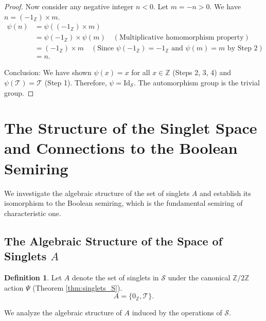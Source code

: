 \documentclass[11pt, a4paper]{article}
\theoremstyle{plain}
\theoremstyle{definition}
\newtheorem{definition}[theorem]{Definition}
\numberwithin{equation}{section}
\newcommand{\Z}{\mathbb{Z}}
\newcommand{\Tobj}{\mathcal{T}} %
\newcommand{\SemiringS}{\mathcal{S}}
\newcommand{\Ztwo}{\mathbb{Z}/2\mathbb{Z}}
\newcommand{\Id}{\mathrm{Id}}
\begin{document}
\begin{proof}
Now consider any negative integer $n<0$. Let $m=-n>0$. We have $n = (-1_{\Z})\times m$.
\begin{align*}
    \psi(n) &= \psi((-1_{\Z})\times m) \\
    &= \psi(-1_{\Z})\times\psi(m) \quad (\text{Multiplicative homomorphism property}) \\
    &= (-1_{\Z})\times m \quad (\text{Since } \psi(-1_{\Z})=-1_{\Z} \text{ and } \psi(m)=m \text{ by Step 2}) \\
    &= n.
\end{align*}

Conclusion: We have shown $\psi(x)=x$ for all $x \in \Z$ (Steps 2, 3, 4) and $\psi(\Tobj)=\Tobj$ (Step 1). Therefore, $\psi = \Id_{\SemiringS}$. The automorphism group is the trivial group.
\end{proof}

\section{The Structure of the Singlet Space and Connections to the Boolean Semiring}

We investigate the algebraic structure of the set of singlets $A$ and establish its isomorphism to the Boolean semiring, which is the fundamental semiring of characteristic one.

\subsection{The Algebraic Structure of the Space of Singlets \texorpdfstring{$A$}{A}}

\begin{definition}
Let $A$ denote the set of singlets in $\SemiringS$ under the canonical $\Ztwo$ action $\Psi$ (Theorem \ref{thm:singlets_S}).
\begin{equation}
    A = \{0_{\Z}, \Tobj\}.
\end{equation}
\end{definition}

We analyze the algebraic structure of $A$ induced by the operations of $\SemiringS$.
\end{document}

